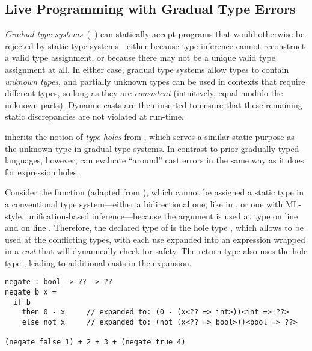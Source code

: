 \subsection{Live Programming with Gradual Type Errors}

\emph{Gradual type systems}~(\eg{}~\cite{XXX,XXX,XXX}) can statically accept
programs that would otherwise be rejected by static type systems---either
because type inference cannot reconstruct a valid type assignment, or because
there may not be a unique valid type assignment at all.
%
In either case, gradual type systems allow types to contain \emph{unknown
types}, and partially unknown types can be used in contexts that require
different types, so long as they are \emph{consistent} (intuitively, equal
modulo the unknown parts).
%
Dynamic casts are then inserted to ensure that these remaining static
discrepancies are not violated at run-time.

\HazelnutLive{} inherits the notion of \emph{type holes} from
\citet{popl-paper}, which serves a similar static purpose as the unknown type in
gradual type systems.
%
In contrast to prior gradually typed languages, however, \HazelnutLive{} can
evaluate ``around'' cast errors in the same way as it does for expression holes.


Consider the  function (adapted from \cite{ChughPOPL2012}), which
cannot be assigned a static type in a conventional type system---either a
bidirectional one, like in \HazelnutLive{}, or one with ML-style,
unification-based inference---because the argument  is used at type
 on line  and  on line .
%
Therefore, the declared type of  is the hole type , which allows
 to be used at the conflicting types, with each use expanded into an
expression wrapped in a \emph{cast} that will dynamically check for safety.
%
The return type also uses the hole type , leading to additional casts in
the expansion.

\begin{lstlisting}
negate : bool -> ?? -> ??
negate b x =
  if b
    then 0 - x     // expanded to: (0 - (x<?? => int>))<int => ??>
    else not x     // expanded to: (not (x<?? => bool>))<bool => ??>

(negate false 1) + 2 + 3 + (negate true 4)
\end{lstlisting}

